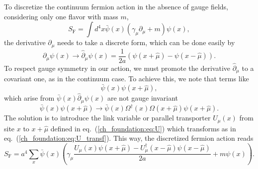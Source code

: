 To discretize the continuum fermion action in the absence of gauge fields, considering only one flavor with mass $m$,
\begin{equation}
S_{\textrm{F}}=\int d^4x\bar{\psi}(x)\left(\gamma_{\mu}\partial_{\mu}+m\right)\psi(x),
\end{equation}
the derivative $\partial_{\mu}$ needs to take a discrete form, which can be done easily by
\begin{equation}
\partial_{\mu}\psi(x)\rightarrow\hat{\partial}_{\mu}\psi(x)=\frac{1}{2a}\left(\psi(x+\hat{\mu})-\psi(x-\hat{\mu})\right).
\end{equation}
To respect gauge symmetry in our action, we must promote the derivative $\hat{\partial}_{\mu}$ to a covariant one, as in the continuum case. To achieve this, we note that terms like
\begin{equation}
\bar{\psi}(x)\psi(x+\hat{\mu}),
\end{equation}
which arise from $\bar{\psi}(x)\hat{\partial}_{\mu}\psi(x)$ are not gauge invariant
\begin{equation}
\bar{\psi}(x)\psi(x+\hat{\mu})\to\bar{\psi}(x)\Omega^{\dagger}(x)\Omega(x+\hat{\mu})\psi(x+\hat{\mu}).
\end{equation}
The solution is to introduce the link variable or parallel transporter $U_{\mu}(x)$ from site $x$ to $x+\hat{\mu}$ defined in eq.~(\ref{ch_foundation:eq:U}) which transforms as in eq.~(\ref{ch_foundation:eq:U_transf}). This way, the discretized fermion action reads
\begin{equation}
\label{ch_foundation:eq:naive}
S_{\textrm{F}}=a^4\sum_x\bar{\psi}(x)\left(\gamma_{\mu}\frac{U_{\mu}(x)\psi(x+\hat{\mu})-U_{\mu}^{\dagger}(x-\hat{\mu})\psi(x-\hat{\mu})}{2a}+m\psi(x)\right).
\end{equation}

